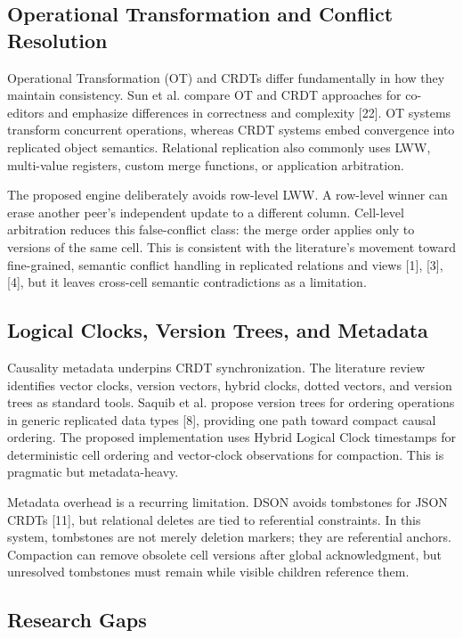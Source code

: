 \documentclass[pdflatex,sn-mathphys-num]{sn-jnl}
\begin{document}
\subsection{Operational Transformation and Conflict Resolution}

Operational Transformation (OT) and CRDTs differ fundamentally in how they maintain consistency. Sun et al. compare OT and CRDT approaches for co-editors and emphasize differences in correctness and complexity [22]. OT systems transform concurrent operations, whereas CRDT systems embed convergence into replicated object semantics. Relational replication also commonly uses LWW, multi-value registers, custom merge functions, or application arbitration.

The proposed engine deliberately avoids row-level LWW. A row-level winner can erase another peer's independent update to a different column. Cell-level arbitration reduces this false-conflict class: the merge order applies only to versions of the same cell. This is consistent with the literature's movement toward fine-grained, semantic conflict handling in replicated relations and views [1], [3], [4], but it leaves cross-cell semantic contradictions as a limitation.

\subsection{Logical Clocks, Version Trees, and Metadata}

Causality metadata underpins CRDT synchronization. The literature review identifies vector clocks, version vectors, hybrid clocks, dotted vectors, and version trees as standard tools. Saquib et al. propose version trees for ordering operations in generic replicated data types [8], providing one path toward compact causal ordering. The proposed implementation uses Hybrid Logical Clock timestamps for deterministic cell ordering and vector-clock observations for compaction. This is pragmatic but metadata-heavy.

Metadata overhead is a recurring limitation. DSON avoids tombstones for JSON CRDTs [11], but relational deletes are tied to referential constraints. In this system, tombstones are not merely deletion markers; they are referential anchors. Compaction can remove obsolete cell versions after global acknowledgment, but unresolved tombstones must remain while visible children reference them.

\subsection{Research Gaps}
\end{document}
